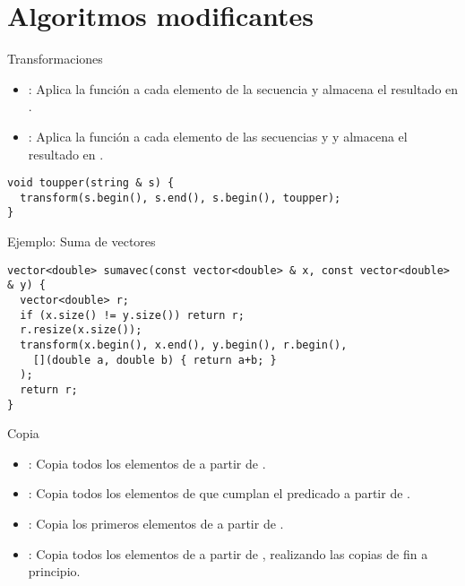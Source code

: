 \section{Algoritmos modificantes}

\begin{frame}[t,fragile]{Transformaciones}
\begin{itemize}
  \item {}: Aplica la función  a cada elemento
        de la secuencia \cppid{[i,f)} 
        y almacena el resultado en \cppid{[o,o+(f-i))}.
  \item {}: Aplica la función  a cada elemento
        de las secuencias \cppid{[i,f)} y \cppid{[i2,i2+(f-i))} 
        y almacena el resultado en \cppid{[o,o+(f-i))}.
\end{itemize}
\begin{lstlisting}
void toupper(string & s) {
  transform(s.begin(), s.end(), s.begin(), toupper); 
}
\end{lstlisting}
\end{frame}

\begin{frame}[t,fragile]{Ejemplo: Suma de vectores}
\begin{lstlisting}
vector<double> sumavec(const vector<double> & x, const vector<double> & y) {
  vector<double> r;
  if (x.size() != y.size()) return r;
  r.resize(x.size());
  transform(x.begin(), x.end(), y.begin(), r.begin(),
    [](double a, double b) { return a+b; }
  );
  return r;
}
\end{lstlisting}
\end{frame}

\begin{frame}[t]{Copia}
\begin{itemize}
  \item {}: Copia todos los elementos de \cppid{[i,f)} 
        a partir de .
  \item {}: Copia todos los elementos de \cppid{[i,f)} 
        que cumplan el predicado  
        a partir de .
  \item {}: Copia los primeros  elementos de \cppid{[i,i+n)} 
        a partir de .
  \item {}: Copia todos los elementos de \cppid{[i,f)} 
        a partir de ,
        realizando las copias de fin a principio.
\end{itemize}
\end{frame}

